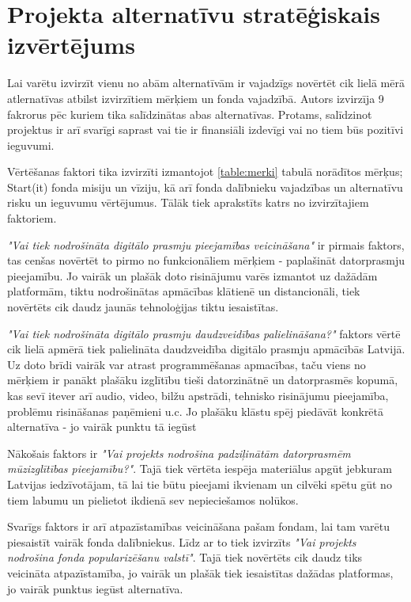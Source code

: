 \section{Projekta alternatīvu stratēģiskais izvērtējums}
Lai varētu izvirzīt vienu no abām alternatīvām ir vajadzīgs novērtēt cik lielā mērā atlernatīvas
atbilst izvirzītiem mērķiem un fonda vajadzībā. Autors izvirzīja 9 fakrorus pēc kuriem tika 
salīdzinātas abas alternatīvas. Protams, salīdzinot projektus ir arī svarīgi saprast vai tie
ir finansiāli izdevīgi vai no tiem būs pozitīvi ieguvumi.
\par
Vērtēšanas faktori tika izvirzīti izmantojot \ref{table:merki} tabulā norādītos mērķus; Start(it)
fonda misiju un vīziju, kā arī fonda dalībnieku vajadzības un alternatīvu risku un ieguvumu vērtējumus.
Tālāk tiek aprakstīts katrs no izvirzītajiem faktoriem.
\par
\textit{"Vai tiek nodrošināta digitālo prasmju pieejamības veicināšana"} ir pirmais faktors,
tas cenšas novērtēt to pirmo no funkcionāliem mērķiem - paplašināt datorprasmju pieejamību. Jo vairāk
un plašāk doto risinājumu varēs izmantot uz dažādām platformām, tiktu nodrošinātas apmācības klātienē
un distancionāli, tiek novērtēts cik daudz jaunās tehnoloģijas tiktu iesaistītas.
\par
\textit{"Vai tiek nodrošināta digitālo prasmju daudzveidības palielināšana?"} faktors vērtē cik
lielā apmērā tiek palielināta daudzveidība digitālo prasmju apmācībās Latvijā. Uz doto brīdi vairāk
var atrast programmēšanas apmacības, taču viens no mērķiem ir panākt plašāku izglītību tieši 
datorzinātnē un datorprasmēs kopumā, kas sevī itever arī audio, video, bilžu apstrādi, tehnisko
risinājumu pieejamība, problēmu risināšanas paņēmieni u.c. Jo plašāku klāstu spēj piedāvāt konkrētā
alternatīva - jo vairāk punktu tā iegūst
\par
Nākošais faktors ir \textit{"Vai projekts nodrošina padziļinātām datorprasmēm mūzizglītības pieejamību?"}. 
Tajā tiek vērtēta iespēja materiālus apgūt jebkuram Latvijas iedzīvotājam, tā lai tie būtu pieejami ikvienam
un cilvēki spētu gūt no tiem labumu un pielietot ikdienā sev nepieciešamos nolūkos.
\par
Svarīgs faktors ir arī atpazīstamības veicināšana pašam fondam, lai tam varētu piesaistīt vairāk
fonda dalībniekus. Līdz ar to tiek izvirzīts \textit{"Vai projekts nodrošina fonda popularizēšanu valstī"}.
Tajā tiek novērtēts cik daudz tiks veicināta atpazīstamība, jo vairāk un plašāk tiek iesaistītas dažādas
platformas, jo vairāk punktus iegūst alternatīva.
